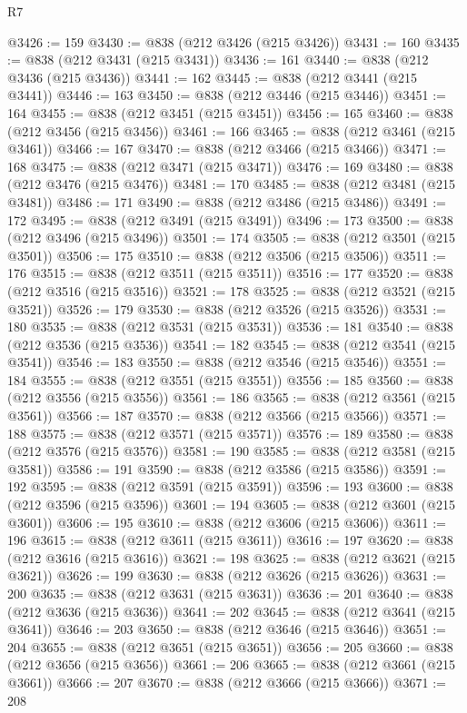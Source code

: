 \begin{lexlean}{R7}
\begin{coremodule}
@3426 := 159
@3430 := @838 (@212 @3426 (@215 @3426))
@3431 := 160
@3435 := @838 (@212 @3431 (@215 @3431))
@3436 := 161
@3440 := @838 (@212 @3436 (@215 @3436))
@3441 := 162
@3445 := @838 (@212 @3441 (@215 @3441))
@3446 := 163
@3450 := @838 (@212 @3446 (@215 @3446))
@3451 := 164
@3455 := @838 (@212 @3451 (@215 @3451))
@3456 := 165
@3460 := @838 (@212 @3456 (@215 @3456))
@3461 := 166
@3465 := @838 (@212 @3461 (@215 @3461))
@3466 := 167
@3470 := @838 (@212 @3466 (@215 @3466))
@3471 := 168
@3475 := @838 (@212 @3471 (@215 @3471))
@3476 := 169
@3480 := @838 (@212 @3476 (@215 @3476))
@3481 := 170
@3485 := @838 (@212 @3481 (@215 @3481))
@3486 := 171
@3490 := @838 (@212 @3486 (@215 @3486))
@3491 := 172
@3495 := @838 (@212 @3491 (@215 @3491))
@3496 := 173
@3500 := @838 (@212 @3496 (@215 @3496))
@3501 := 174
@3505 := @838 (@212 @3501 (@215 @3501))
@3506 := 175
@3510 := @838 (@212 @3506 (@215 @3506))
@3511 := 176
@3515 := @838 (@212 @3511 (@215 @3511))
@3516 := 177
@3520 := @838 (@212 @3516 (@215 @3516))
@3521 := 178
@3525 := @838 (@212 @3521 (@215 @3521))
@3526 := 179
@3530 := @838 (@212 @3526 (@215 @3526))
@3531 := 180
@3535 := @838 (@212 @3531 (@215 @3531))
@3536 := 181
@3540 := @838 (@212 @3536 (@215 @3536))
@3541 := 182
@3545 := @838 (@212 @3541 (@215 @3541))
@3546 := 183
@3550 := @838 (@212 @3546 (@215 @3546))
@3551 := 184
@3555 := @838 (@212 @3551 (@215 @3551))
@3556 := 185
@3560 := @838 (@212 @3556 (@215 @3556))
@3561 := 186
@3565 := @838 (@212 @3561 (@215 @3561))
@3566 := 187
@3570 := @838 (@212 @3566 (@215 @3566))
@3571 := 188
@3575 := @838 (@212 @3571 (@215 @3571))
@3576 := 189
@3580 := @838 (@212 @3576 (@215 @3576))
@3581 := 190
@3585 := @838 (@212 @3581 (@215 @3581))
@3586 := 191
@3590 := @838 (@212 @3586 (@215 @3586))
@3591 := 192
@3595 := @838 (@212 @3591 (@215 @3591))
@3596 := 193
@3600 := @838 (@212 @3596 (@215 @3596))
@3601 := 194
@3605 := @838 (@212 @3601 (@215 @3601))
@3606 := 195
@3610 := @838 (@212 @3606 (@215 @3606))
@3611 := 196
@3615 := @838 (@212 @3611 (@215 @3611))
@3616 := 197
@3620 := @838 (@212 @3616 (@215 @3616))
@3621 := 198
@3625 := @838 (@212 @3621 (@215 @3621))
@3626 := 199
@3630 := @838 (@212 @3626 (@215 @3626))
@3631 := 200
@3635 := @838 (@212 @3631 (@215 @3631))
@3636 := 201
@3640 := @838 (@212 @3636 (@215 @3636))
@3641 := 202
@3645 := @838 (@212 @3641 (@215 @3641))
@3646 := 203
@3650 := @838 (@212 @3646 (@215 @3646))
@3651 := 204
@3655 := @838 (@212 @3651 (@215 @3651))
@3656 := 205
@3660 := @838 (@212 @3656 (@215 @3656))
@3661 := 206
@3665 := @838 (@212 @3661 (@215 @3661))
@3666 := 207
@3670 := @838 (@212 @3666 (@215 @3666))
@3671 := 208

\end{coremodule}
\end{lexlean}
